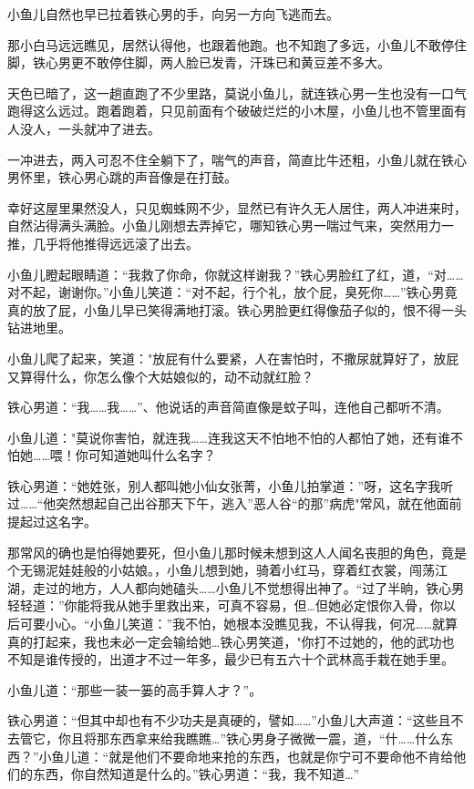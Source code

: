 \documentclass[12pt,oneside]{book}
\begin{document}
小鱼儿自然也早已拉着铁心男的手，向另一方向飞逃而去。

那小白马远远瞧见，居然认得他，也跟着他跑。也不知跑了多远，小鱼儿不敢停住脚，铁心男更不敢停住脚，两人脸已发青，汗珠已和黄豆差不多大。

天色已暗了，这一趟直跑了不少里路，莫说小鱼儿，就连铁心男一生也没有一口气跑得这么远过。跑着跑着，只见前面有个破破烂烂的小木屋，小鱼儿也不管里面有人没人，一头就冲了进去。

一冲进去，两入可忍不住全躺下了，喘气的声音，简直比牛还粗，小鱼儿就在铁心男怀里，铁心男心跳的声音像是在打鼓。

幸好这屋里果然没人，只见蜘蛛网不少，显然已有许久无人居住，两人冲进来时，自然沾得满头满脸。小鱼儿刚想去弄掉它，哪知铁心男一喘过气来，突然用力一推，几乎将他推得远远滚了出去。

小鱼儿瞪起眼睛道：``我救了你命，你就这样谢我？''铁心男脸红了红，道，``对\ldots\ldots 对不起，谢谢你。''小鱼儿笑道：``对不起，行个礼，放个屁，臭死你\ldots\ldots{}''铁心男竟真的放了屁，小鱼儿早已笑得满地打滚。铁心男脸更红得像茄子似的，恨不得一头钻进地里。

小鱼儿爬了起来，笑道："放屁有什么要紧，人在害怕时，不撒尿就算好了，放屁又算得什么，你怎么像个大姑娘似的，动不动就红脸？

铁心男道：``我\ldots\ldots 我\ldots\ldots{}''、他说话的声音简直像是蚊子叫，连他自己都听不清。

小鱼儿道："莫说你害怕，就连我\ldots\ldots 连我这天不怕地不怕的人都怕了她，还有谁不怕她\ldots\ldots 喂！你可知道她叫什么名字？

铁心男道：``她姓张，别人都叫她小仙女张菁，小鱼儿拍掌道：''呀，这名字我听过\ldots\ldots{}``他突然想起自己出谷那天下午，逃入''恶人谷``的那''病虎"常风，就在他面前提起过这名字。

那常风的确也是怕得她要死，但小鱼儿那时候未想到这人人闻名丧胆的角色，竟是个无锡泥娃娃般的小姑娘。，小鱼儿想到她，骑着小红马，穿着红衣裳，闯荡江湖，走过的地方，人人都向她磕头\ldots\ldots 小鱼儿不觉想得出神了。``过了半晌，铁心男轻轻道：''你能将我从她手里救出来，可真不容易，但\ldots 但她必定恨你入骨，你以后可要小心。``小鱼儿笑道：''我不怕，她根本没瞧见我，不认得我，何况\ldots\ldots 就算真的打起来，我也未必一定会输给她\ldots 铁心男笑道，"你打不过她的，他的武功也不知是谁传授的，出道才不过一年多，最少已有五六十个武林高手栽在她手里。

小鱼儿道：``那些一装一篓的高手算人才？''。

铁心男道：``但其中却也有不少功夫是真硬的，譬如\ldots\ldots{}''小鱼儿大声道：``这些且不去管它，你且将那东西拿来给我瞧瞧\ldots{}''铁心男身子微微一震，道，``什\ldots\ldots 什么东西？''小鱼儿道：``就是他们不要命地来抢的东西，也就是你宁可不要命他不肯给他们的东西，你自然知道是什么的。''铁心男道：``我，我不知道\ldots{}''
\end{document}
